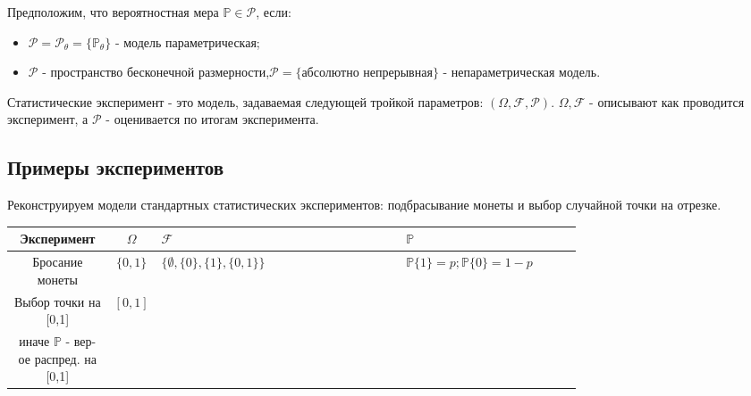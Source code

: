 \documentclass[a4 paper]{article}
\begin{document}
Предположим, что вероятностная мера $\mathbb{P} \in \mathcal{P}$, если:
\begin{itemize}
    \item $\mathcal{P} = \mathcal{P}_{\theta} = \{\mathbb{P}_{\theta} \}$ - модель параметрическая;
    \item $\mathcal{P}$ - пространство бесконечной размерности,$\mathcal{P} = \{\text{абсолютно непрерывная}\}$ - непараметрическая модель.
\end{itemize}

\begin{defin}
Статистические эксперимент - это модель, задаваемая следующей тройкой параметров: $(\Omega, \mathcal{F}, \mathcal{P})$. $\Omega, \mathcal{F}$ - описывают как проводится эксперимент, а $\mathcal{P}$ - оценивается по итогам эксперимента. 
\end{defin}


\subsection{Примеры экспериментов}
Реконструируем модели стандартных статистических экспериментов: подбрасывание монеты и выбор случайной точки на отрезке.
\begin{table}[h]
    \centering
    \begin{tabular}{|c|c|p{0.43\linewidth}|p{0.31\linewidth}|}
        \hline
        Эксперимент &  $\Omega$ & $\mathcal{F}$ & $\mathbb{P}$\\
        \hline
        Бросание монеты &  $\{0,1\}$ & $\{ \emptyset, \{0\}, \{1\}, \{0,1\}\}$ & $\mathbb{P}\{1\}=p; \mathbb{P}\{0\} = 1-p$\\
        \hline
        Выбор точки на [0,1] & $[0,1]$ & 
        \specialcell{$
        \{ \{[a,b], 0 \leq a < b \leq 1\}, (a,b)  = \Omega \backslash([0,a] \cup [b,1]), \\\ 
        [a,b) = \cap (a - \frac{1}{n}, b), (a,b] = \cap (a, b + \frac1n) \\\ 
        \{a\} = [0,a] \cap [a,1] \}$ - Борелевская $\sigma$ -  алгебра}& \specialcell{$\mathbb{P} \{[a,b]\} = b-a$ - нет косоглазия, \\ иначе $\mathbb{P}$ - вер-ое распред. на [0,1]} \\
        \hline
    \end{tabular}
    \label{tab:my_label}
\end{table}
\end{document}
